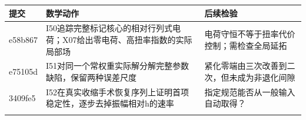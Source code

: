 \documentclass[
  10pt,
]{article}
\begin{document}
\begin{longtable}[]{@{}>{\raggedright\arraybackslash}p{\dimexpr(\linewidth-4\tabcolsep)/3\relax}>{\raggedright\arraybackslash}p{\dimexpr(\linewidth-4\tabcolsep)/3\relax}>{\raggedright\arraybackslash}p{\dimexpr(\linewidth-4\tabcolsep)/3\relax}@{}}
\toprule
\begin{minipage}[b]{0.30\columnwidth}\raggedright
提交\strut
\end{minipage} & \begin{minipage}[b]{0.30\columnwidth}\raggedright
数学动作\strut
\end{minipage} & \begin{minipage}[b]{0.30\columnwidth}\raggedright
后续检验\strut
\end{minipage}\tabularnewline
\midrule
\endhead
\begin{minipage}[t]{0.30\columnwidth}\raggedright
e58b867\strut
\end{minipage} & \begin{minipage}[t]{0.30\columnwidth}\raggedright
I50追踪完整标记核心的相对行列式电荷；X07给出零电荷、高扭率指数的实际局部场\strut
\end{minipage} & \begin{minipage}[t]{0.30\columnwidth}\raggedright
电荷守恒不等于扭率代价控制；需检查全局延拓\strut
\end{minipage}\tabularnewline
\begin{minipage}[t]{0.30\columnwidth}\raggedright
e75105d\strut
\end{minipage} & \begin{minipage}[t]{0.30\columnwidth}\raggedright
I51对同一个常权重实际解分解完整参数缺陷，保留两种误差尺度\strut
\end{minipage} & \begin{minipage}[t]{0.30\columnwidth}\raggedright
紧化零端由三次改善到二次，但未成为非退化间隙\strut
\end{minipage}\tabularnewline
\begin{minipage}[t]{0.30\columnwidth}\raggedright
3409fe5\strut
\end{minipage} & \begin{minipage}[t]{0.30\columnwidth}\raggedright
I52在真实收缩手术恢复序列上证明首项稳定性，逐步去掉振幅相对h的速率\strut
\end{minipage} & \begin{minipage}[t]{0.30\columnwidth}\raggedright
指定规范能否从一般输入自动取得？\strut
\end{minipage}\tabularnewline
\begin{minipage}[t]{0.30\columnwidth}\raggedright

\end{minipage}
\end{longtable}
\end{document}
